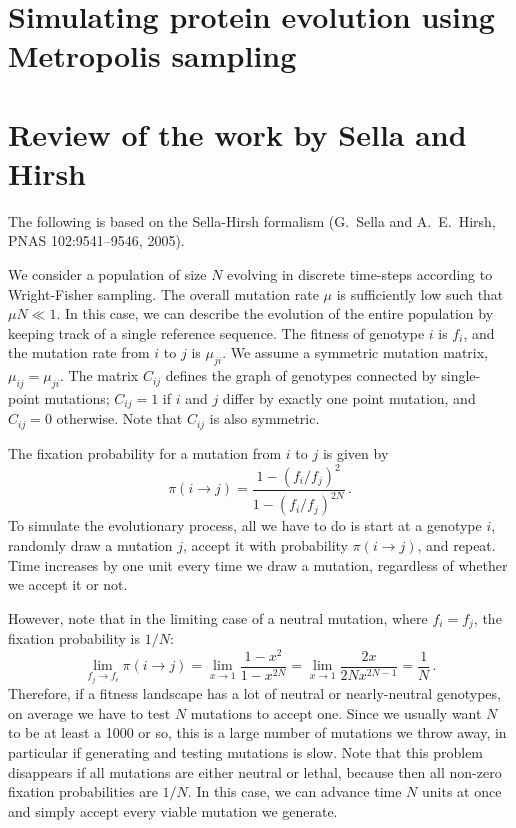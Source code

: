 \documentclass[12pt]{article}
\begin{document}
\section*{Simulating protein evolution using Metropolis sampling}

\section{Review of the work by Sella and Hirsh}

The following is based on the Sella-Hirsh formalism (G.\ Sella and A.~E.\ Hirsh, PNAS 102:9541--9546, 2005).

We consider a population of size $N$ evolving in discrete time-steps according to Wright-Fisher sampling. The overall mutation rate $\mu$ is sufficiently low such that $\mu N\ll 1$. In this case, we can describe the evolution of the entire population by keeping track of a single reference sequence. The fitness of genotype $i$ is $f_i$, and the mutation rate from $i$ to $j$ is $\mu_{ji}$. We assume a symmetric mutation matrix, $\mu_{ij}=\mu_{ji}$. The matrix $C_{ij}$ defines the graph of genotypes connected by single-point mutations; $C_{ij}=1$ if $i$ and $j$ differ by exactly one point mutation, and $C_{ij}=0$ otherwise. Note that $C_{ij}$ is also symmetric.

The fixation probability for a mutation from $i$ to $j$ is given by
\begin{equation}\label{eq:pfix}
  \pi(i\rightarrow j) = \frac{1-(f_i/f_j)^2}{1-(f_i/f_j)^{2N}}\,.
\end{equation}
To simulate the evolutionary process, all we have to do is start at a genotype $i$, randomly draw a mutation $j$, accept it with probability $\pi(i\rightarrow j)$, and repeat. Time increases by one unit every time we draw a mutation, regardless of whether we accept it or not.

However, note that in the limiting case of a neutral mutation, where $f_i=f_j$, the fixation probability is $1/N$:
\begin{equation}
 \lim_{f_j\rightarrow f_i} \pi(i\rightarrow j) = \lim_{x\rightarrow 1} \frac{1-x^2}{1-x^{2N}} = 
  \lim_{x\rightarrow 1} \frac{2x}{2Nx^{2N-1}} = \frac{1}{N}\,.
\end{equation}
Therefore, if a fitness landscape has a lot of neutral or nearly-neutral genotypes, on average we have to test $N$ mutations to accept one. Since we usually want $N$ to be at least a 1000 or so, this is a large number of mutations we throw away, in particular if generating and testing mutations is slow. Note that this problem disappears if all mutations are either neutral or lethal, because then all non-zero fixation probabilities are $1/N$. In this case, we can advance time $N$ units at once and simply accept every viable mutation we generate.
\end{document}
